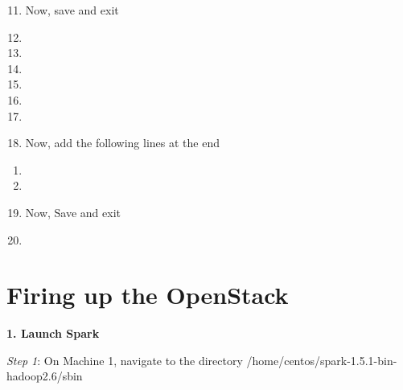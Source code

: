 \documentclass[letterpaper,12pt,english]{sphinxmanual}
\begin{document}
\begin{enumerate}
\setcounter{enumi}{10}
\item {} 
Now, save and exit

\item {} 

\item {} 

\item {} 

\item {} 

\item {} 

\item {} 

\item {} 
Now, add the following lines at the end

\end{enumerate}
\begin{enumerate}
\item {} 

\item {} 

\end{enumerate}
\begin{enumerate}
\setcounter{enumi}{18}
\item {} 
Now, Save and exit

\item {} 

\end{enumerate}


\section{Firing up the OpenStack}
\label{openStackStartUp:firing-up-the-openstack}\label{openStackStartUp::doc}
\textbf{1. Launch Spark}

\begin{DUlineblock}{0em}
\item[] \emph{Step 1}: On Machine 1, navigate to the directory /home/centos/spark-1.5.1-bin-hadoop2.6/sbin
\end{DUlineblock}
\end{document}
